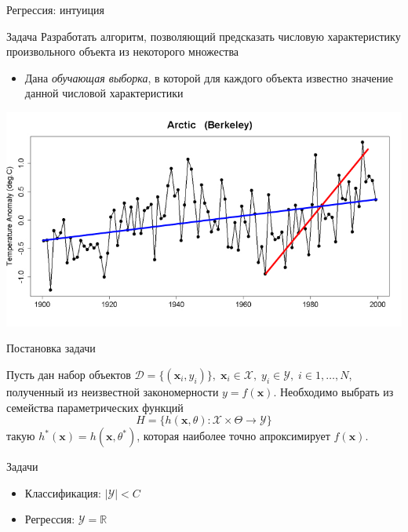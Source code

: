 \documentclass[10pt]{beamer}
\begin{document}
\begin{frame}{Регрессия: интуиция}

\begin{block}{Задача}
Разработать алгоритм, позволяющий предсказать числовую характеристику произвольного объекта из некоторого множества
\begin{itemize}
\item Дана {\it обучающая выборка}, в которой для каждого объекта известно значение данной числовой характеристики
\end{itemize}
\end{block}

\begin{center}
\includegraphics[scale=0.3]{images/kioto.png}
\end{center}

\end{frame}

\begin{frame}{Постановка задачи}

Пусть дан набор объектов $\mathcal{D} = \{(\mathbf{x}_i, y_i)\},
\; \mathbf{x}_i \in \mathcal{X},
\; y_i \in \mathcal{Y},
\; i \in 1, \ldots, N$, полученный из неизвестной закономерности $y = f(\mathbf{x})$. Необходимо выбрать из семейства параметрических функций
\[
H = \{h(\mathbf{x}, \theta): \mathcal{X} \times \Theta \rightarrow \mathcal{Y} \}
\]
такую $h^*(\mathbf{x}) = h(\mathbf{x}, \theta^*)$, которая наиболее точно апроксимирует $f(\mathbf{x})$.

\vspace{1em}
Задачи
\begin{itemize}
\item Классификация: $|\mathcal{Y}| < C$
\item Регрессия: $\mathcal{Y} = \mathbb{R}$
\end{itemize}

\end{frame}
\end{document}
